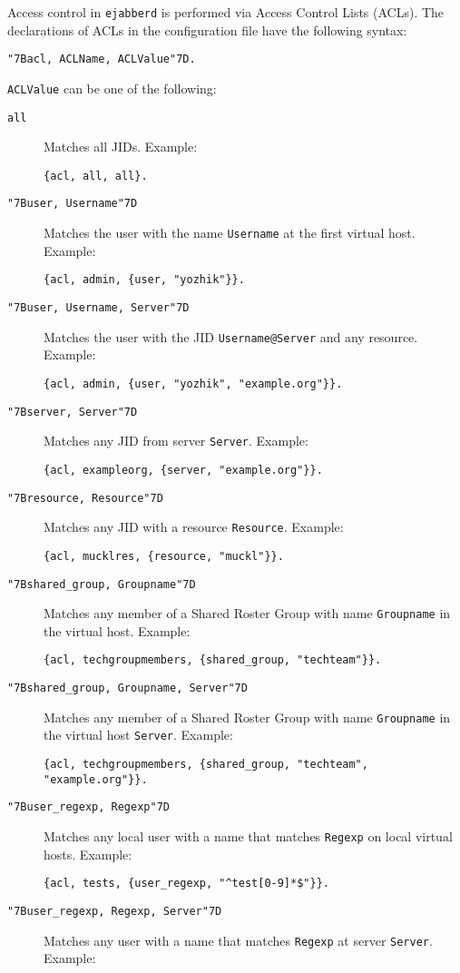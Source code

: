 \documentclass[a4paper,10pt]{book}
\newcommand{\bracehack}{\def\{{\char"7B}\def\}{\char"7D}}
\newcommand{\titem}[1]{\item[\bracehack\texttt{#1}]}
\newcommand{\term}[1]{\texttt{#1}}
\newcommand{\ejabberd}{\texttt{ejabberd}}
\newcommand{\esyntax}[1]{\begin{description}\titem{#1}\end{description}}
\begin{document}
Access control in \ejabberd{} is performed via Access Control Lists (ACLs). The
declarations of ACLs in the configuration file have the following syntax:
\esyntax{\{acl, ACLName, ACLValue\}.}

\term{ACLValue} can be one of the following:
\begin{description}
\titem{all} Matches all JIDs. Example:
\begin{verbatim}
{acl, all, all}.
\end{verbatim}
\titem{\{user, Username\}} Matches the user with the name
  \term{Username} at the first virtual host. Example:
\begin{verbatim}
{acl, admin, {user, "yozhik"}}.
\end{verbatim}
\titem{\{user, Username, Server\}} Matches the user with the JID
  \term{Username@Server} and any resource. Example:
\begin{verbatim}
{acl, admin, {user, "yozhik", "example.org"}}.
\end{verbatim}
\titem{\{server, Server\}} Matches any JID from server
  \term{Server}. Example:
\begin{verbatim}
{acl, exampleorg, {server, "example.org"}}.
\end{verbatim}
\titem{\{resource, Resource\}} Matches any JID with a resource
  \term{Resource}. Example:
\begin{verbatim}
{acl, mucklres, {resource, "muckl"}}.
\end{verbatim}
\titem{\{shared\_group, Groupname\}} Matches any member of a Shared Roster Group with name \term{Groupname} in the virtual host. Example:
\begin{verbatim}
{acl, techgroupmembers, {shared_group, "techteam"}}.
\end{verbatim}
\titem{\{shared\_group, Groupname, Server\}} Matches any member of a Shared Roster Group with name \term{Groupname} in the virtual host \term{Server}. Example:
\begin{verbatim}
{acl, techgroupmembers, {shared_group, "techteam", "example.org"}}.
\end{verbatim}
\titem{\{user\_regexp, Regexp\}} Matches any local user with a name that
  matches \term{Regexp} on local virtual hosts. Example:
\begin{verbatim}
{acl, tests, {user_regexp, "^test[0-9]*$"}}.
\end{verbatim}
\titem{\{user\_regexp, Regexp, Server\}} Matches any user with a name
  that matches \term{Regexp} at server \term{Server}. Example:
\begin{verbatim}

\end{verbatim}
\end{description}
\end{document}
